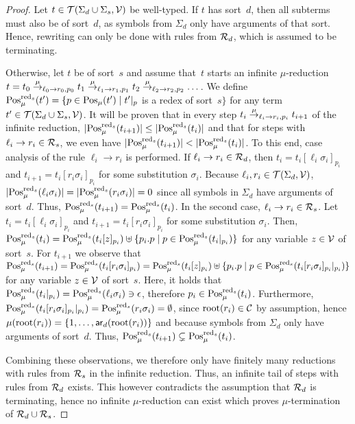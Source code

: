 \documentclass{eptcs}
\begin{document}
\begin{proof}
Let $t \in \mathcal{T}(\Sigma_d \cup \Sigma_s, \mathcal{V})$ be well-typed.
If $t$ has sort~$d$, then all subterms must also be of sort~$d$, as symbols from
$\Sigma_d$ only have arguments of that sort. Hence, rewriting can only be done
with rules from $\mathcal{R}_d$, which is assumed to be terminating.

Otherwise, let $t$ be of sort~$s$ and assume that~$t$ starts an infinite
$\mu$-reduction
$t = t_0 \mathrel{\smash{\overset{\mu}{\rightarrow}}}_{\ell_0 \to r_0, p_0} t_1 \mathrel{\smash{\overset{\mu}{\rightarrow}}}_{\ell_1 \to r_1, p_1} t_2
    \mathrel{\smash{\overset{\mu}{\rightarrow}}}_{\ell_2 \to r_2, p_2} \dots$.
We define
$\mathrm{Pos}^{\mathrm{red}_s}_\mu(t') = \{ p \in \mathrm{Pos}_\mu(t') \mid t'|_p$ is a redex of sort~$s \}$
for any term $t' \in \mathcal{T}(\Sigma_d \cup \Sigma_s, \mathcal{V})$.
It will be proven that in every step $t_i \mathrel{\smash{\overset{\mu}{\rightarrow}}}_{\ell_i \to r_i, p_i} t_{i+1}$
of the infinite reduction,
$\lvert\mathrm{Pos}^{\mathrm{red}_s}_\mu(t_{i+1})\rvert \le \lvert\mathrm{Pos}^{\mathrm{red}_s}_\mu(t_i)\rvert$
and that for steps with $\ell_i \to r_i \in \mathcal{R}_s$, we even have
$\lvert\mathrm{Pos}^{\mathrm{red}_s}_\mu(t_{i+1})\rvert < \lvert\mathrm{Pos}^{\mathrm{red}_s}_\mu(t_i)\rvert$.
To this end, case analysis of the rule $\ell_i \to r_i$ is performed.
If $\ell_i \to r_i \in \mathcal{R}_d$, then $t_i = t_i[\ell_i\sigma_i]_{p_i}$ and
$t_{i+1} = t_i[r_i\sigma_i]_{p_i}$ for some substitution $\sigma_i$.
Because $\ell_i, r_i \in \mathcal{T}(\Sigma_d,\mathcal{V})$,
$\lvert\mathrm{Pos}^{\mathrm{red}_s}_\mu(\ell_i\sigma_i)\rvert
= \lvert\mathrm{Pos}^{\mathrm{red}_s}_\mu(r_i\sigma_i)\rvert = 0$
since all symbols in $\Sigma_d$ have arguments of sort~$d$.
Thus, $\mathrm{Pos}^{\mathrm{red}_s}_\mu(t_{i+1}) = \mathrm{Pos}^{\mathrm{red}_s}_\mu(t_i)$.
In the second case, $\ell_i \to r_i \in \mathcal{R}_s$. Let
$t_i = t_i[\ell_i\sigma_i]_{p_i}$ and
$t_{i+1} = t_i[r_i\sigma_i]_{p_i}$ for some substitution $\sigma_i$.
Then, $\mathrm{Pos}^{\mathrm{red}_s}_\mu(t_i) =
    \mathrm{Pos}^{\mathrm{red}_s}_\mu(t_i[z]_{p_i})
    \uplus \{ p_i.p \mid p \in \mathrm{Pos}^{\mathrm{red}_s}_\mu(t_i|_{p_i}) \}$
for any variable $z \in \mathcal{V}$ of sort~$s$.
For $t_{i+1}$ we observe that
$\mathrm{Pos}^{\mathrm{red}_s}_\mu(t_{i+1}) = \mathrm{Pos}^{\mathrm{red}_s}_\mu(t_i[r_i\sigma_i]_{p_i}) =
    \mathrm{Pos}^{\mathrm{red}_s}_\mu(t_i[z]_{p_i})
    \uplus \{ p_i.p \mid p \in \mathrm{Pos}^{\mathrm{red}_s}_\mu(t_i[r_i\sigma_i]_{p_i}|_{p_i}) \}$
for any variable $z \in \mathcal{V}$ of sort~$s$.
Here, it holds that
$\mathrm{Pos}^{\mathrm{red}_s}_\mu(t_i|_{p_i}) = \mathrm{Pos}^{\mathrm{red}_s}_\mu(\ell_i\sigma_i) \ni \epsilon$,
therefore $p_i \in \mathrm{Pos}^{\mathrm{red}_s}_\mu(t_i)$.
Furthermore, $\mathrm{Pos}^{\mathrm{red}_s}_\mu(t_i[r_i\sigma_i]_{p_i}|_{p_i}) =
    \mathrm{Pos}^{\mathrm{red}_s}_\mu(r_i\sigma_i) = \emptyset$,
since $\mathrm{root}(r_i) \in \mathcal{C}$ by assumption, hence
$\mu(\mathrm{root}(r_i)) = \{ 1, \dotsc, \mathsf{ar}_d(\mathrm{root}(r_i)) \}$ and because symbols from
$\Sigma_d$ only have arguments of sort~$d$.
Thus, $\mathrm{Pos}^{\mathrm{red}_s}_\mu(t_{i+1}) \subsetneq \mathrm{Pos}^{\mathrm{red}_s}_\mu(t_i)$.

Combining these observations, we therefore only have finitely many reductions
with rules from $\mathcal{R}_s$ in the infinite reduction. Thus, an infinite tail of
steps with rules from $\mathcal{R}_d$ exists. This however contradicts the assumption
that $\mathcal{R}_d$ is terminating, hence no infinite $\mu$-reduction can exist which
proves $\mu$-termination of $\mathcal{R}_d \cup \mathcal{R}_s$.
\end{proof}
\end{document}
